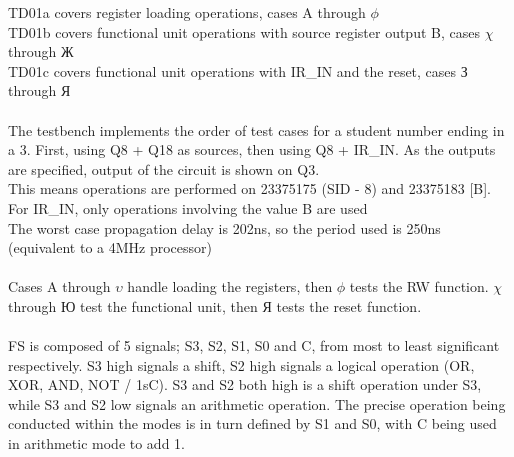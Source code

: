 \documentclass{article}
\begin{document}
\newpage
\maketitle
TD01a covers register loading operations, cases A through $\phi$ \\
TD01b covers functional unit operations with source register output B, cases $\chi$ through Ж \\
TD01c covers functional unit operations with IR\_IN and the reset, cases З through Я \\
\\
The testbench implements the order of test cases for a student number ending in a 3. First, using Q8 + Q18 as sources, then using Q8 + IR\_IN. As the outputs are specified, output of the circuit is shown on Q3.\\
This means operations are performed on 23375175 (SID - 8) and 23375183 [B]. \\
For IR\_IN, only operations involving the value B are used\\ 
The worst case propagation delay is 202ns, so the period used is 250ns (equivalent to a 4MHz processor)\\ \\
Cases A through $\upsilon$ handle loading the registers, then $\phi$ tests the RW function. $\chi$ through Ю test the functional unit, then Я tests the reset function.\\ \\
FS is composed of 5 signals; S3, S2, S1, S0 and C, from most to least significant respectively. S3 high signals a shift, S2 high signals a logical operation (OR, XOR, AND, NOT / 1sC). S3 and S2 both high is a shift operation under S3, while S3 and S2 low signals an arithmetic operation. The precise operation being conducted within the modes is in turn defined by S1 and S0, with C being used in arithmetic mode to add 1.
\end{document}
